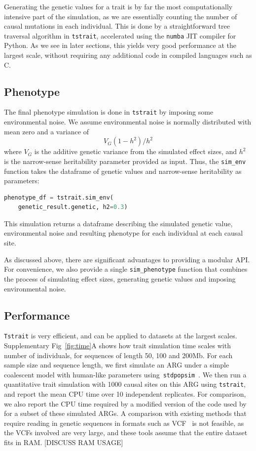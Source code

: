 \documentclass[unnumsec,webpdf,modern,large,namedate]{oup-authoring-template}%
\begin{document}
Generating the genetic values for a trait is by far the
most computationally intensive part of the simulation,
as we are essentially counting the number
of causal mutations in each individual. This is done by a
straightforward tree traversal algorithm in \texttt{tstrait},
accelerated using the \texttt{numba} JIT compiler for Python.
As we see in later sections, this yields very good performance
at the largest scale, without requiring any additional code in
compiled languages such as C.

\subsection{Phenotype}
The final phenotype simulation is done in \texttt{tstrait}
by imposing some environmental noise.
We assume environmental noise is normally distributed with mean zero
and a variance of
\[
V_G(1-h^2)/{h^2}
\]
where $V_G$ is the additive genetic variance from the simulated effect sizes,
and $h^2$ is the narrow-sense heritability parameter provided as input.
Thus, the \texttt{sim\_env} function takes the dataframe of genetic values
and narrow-sense heritability as parameters:
\begin{lstlisting}[language=Python]
phenotype_df = tstrait.sim_env(
    genetic_result.genetic, h2=0.3)
\end{lstlisting}
This simulation returns a dataframe
describing the simulated genetic value, environmental noise and
resulting phenotype for each individual at each causal site.

As discussed above, there are significant advantages to providing a modular
API. For convenience, we also provide a single
\texttt{sim\_phenotype} function that combines the process of simulating
effect sizes, generating genetic values and imposing environmental noise.

\subsection{Performance}
\texttt{Tstrait} is very efficient, and can be applied to datasets at the
largest scales.
Supplementary Fig~\ref{fig:time}A shows how trait simulation time scales
with number of individuals, for sequences of length 50, 100 and 200Mb.
For each sample size and sequence length,
we first simulate an ARG under a simple coalescent model with
human-like parameters using~\texttt{stdpopsim}~\citep{adrion2020}.
We then run a quantitative trait simulation
with 1000 causal sites on this ARG using \texttt{tstrait},
and report the mean CPU time over 10 independent replicates.
For comparison, we also report the CPU time required by a
modified version of the code used by \citet{martin2017} for a
subset of these simulated ARGs.
A comparison with existing methods that require reading
in genetic sequences in formats such as
VCF~\citep[e.g.][]{meyer2018,fernandes2020} is not feasible,
as the VCFs involved are very large, and these tools assume that
the entire dataset fits in RAM.
[DISCUSS RAM USAGE]
\end{document}
